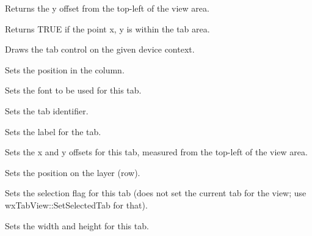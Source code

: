 
Returns the y offset from the top-left of the view area.



Returns TRUE if the point x, y is within the tab area.



Draws the tab control on the given device context.



Sets the position in the column.



Sets the font to be used for this tab.



Sets the tab identifier.



Sets the label for the tab.



Sets the x and y offsets for this tab, measured from the top-left of the view area.



Sets the position on the layer (row).



Sets the selection flag for this tab (does not set the current tab for the view;
use wxTabView::SetSelectedTab for that).



Sets the width and height for this tab.


